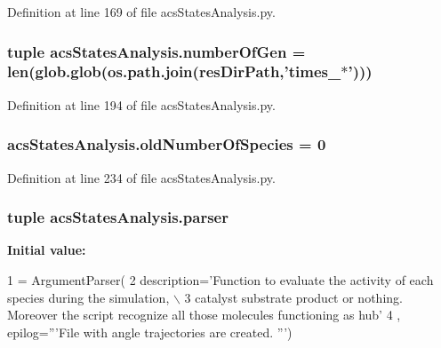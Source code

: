 Definition at line 169 of file acs\-States\-Analysis.\-py.

\hypertarget{a00130_a54acb4eba0735e72c2a820383febd37f}{
\subsubsection[{number\-Of\-Gen}]{\setlength{\rightskip}{0pt plus 5cm}tuple acs\-States\-Analysis.\-number\-Of\-Gen = len(glob.\-glob(os.\-path.\-join({\bf res\-Dir\-Path},'times\-\_\-$\ast$')))}}\label{a00130_a54acb4eba0735e72c2a820383febd37f}


Definition at line 194 of file acs\-States\-Analysis.\-py.

\hypertarget{a00130_abe1ce9bb85ee916d2046efc5c3fe6b30}{
\subsubsection[{old\-Number\-Of\-Species}]{\setlength{\rightskip}{0pt plus 5cm}acs\-States\-Analysis.\-old\-Number\-Of\-Species = 0}}\label{a00130_abe1ce9bb85ee916d2046efc5c3fe6b30}


Definition at line 234 of file acs\-States\-Analysis.\-py.

\hypertarget{a00130_ac24ead92a86e25ec9213d8c7253d4b60}{
\subsubsection[{parser}]{\setlength{\rightskip}{0pt plus 5cm}tuple acs\-States\-Analysis.\-parser}}\label{a00130_ac24ead92a86e25ec9213d8c7253d4b60}
{\bfseries Initial value\-:}
\begin{DoxyCode}
1 = ArgumentParser(
2                                 description=\textcolor{stringliteral}{'Function to evaluate the activity of each species during the
       simulation, \(\backslash\)}
3 \textcolor{stringliteral}{                                catalyst substrate product or nothing. Moreover the script recognize all
       those molecules functioning as hub'}
4                                 , epilog=\textcolor{stringliteral}{'''File with angle trajectories are created. '''})
\end{DoxyCode}


